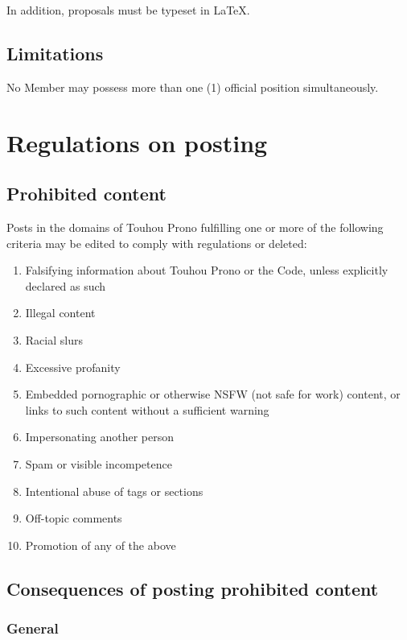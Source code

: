 \documentclass[10pt]{book}
\begin{document}
In addition, proposals must be typeset in \LaTeX.

\section{Limitations}

No Member may possess more than one (1) official position simultaneously.

\chapter{Regulations on posting}
\label{chapter:postreg}

\section{Prohibited content}
\label{sec:procon}

Posts in the domains of Touhou Prono fulfilling one or more of the following criteria may be edited to comply with regulations or deleted:

\begin{enumerate}
 \item Falsifying information about Touhou Prono or the Code, unless explicitly declared as such
 \item Illegal content
 \item Racial slurs
 \item Excessive profanity
 \item Embedded pornographic or otherwise NSFW (not safe for work) content, or links to such content without a sufficient warning
 \item Impersonating another person
 \item Spam or visible incompetence
 \item Intentional abuse of tags or sections
 \item Off-topic comments
 \item Promotion of any of the above
\end{enumerate}

\section{Consequences of posting prohibited content}
\label{sec:postcons}

\subsection{General}
\end{document}
